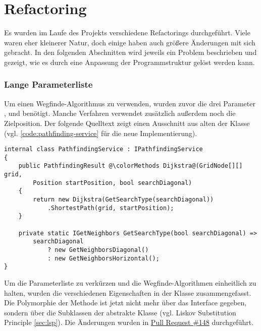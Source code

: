 \part{Refactoring}
Es wurden im Laufe des Projekts verschiedene Refactorings durchgeführt.
Viele waren eher kleinerer Natur, doch einige haben auch größere Änderungen
mit sich gebracht.
In den folgenden Abschnitten wird jeweils ein Problem beschrieben und
gezeigt, wie es durch eine Anpassung der Programmstruktur gelöst werden kann.

\section{Lange Parameterliste}
Um einen Wegfinde-Algorithmus zu verwenden, wurden zuvor die
drei Parameter ,  und
 benötigt. Manche Verfahren verwendet zusätzlich außerdem
noch die Zielposition. Der folgende Quelltext zeigt einen Ausschnitt aus alten der
 Klasse
(vgl. \autoref{code:pathfinding-service} für die neue Implementierung).
\begin{lstlisting}[caption={Die alte \lstinline{PathfindingService} Klasse},
    label={code:use-pathfinding}]
internal class PathfindingService : IPathfindingService
{
    public PathfindingResult @\colorMethods Dijkstra@(GridNode[][] grid,
        Position startPosition, bool searchDiagonal)
    {
        return new Dijkstra(GetSearchType(searchDiagonal))
            .ShortestPath(grid, startPosition);
    }

    private static IGetNeighbors GetSearchType(bool searchDiagonal) =>
        searchDiagonal
            ? new GetNeighborsDiagonal()
            : new GetNeighborsHorizontal();
}
\end{lstlisting}
Um die Parameterliste zu verkürzen und die Wegfinde-Algorithmen
einheitlich zu halten, wurden die verschiedenen Eigenschaften in der Klasse
 zusammengefasst.
Die Polymorphie der  Methode
ist jetzt nicht mehr über das Interface 
gegeben, sondern über die Subklassen der abstrakte Klasse
 (vgl. Liskov Substitution Principle \ref{sec:lsp}).
Die Änderungen wurden in
\href{https://github.com/JensDll/pathfinding-visualization/pull/148}{Pull Request \#148}
durchgeführt.

